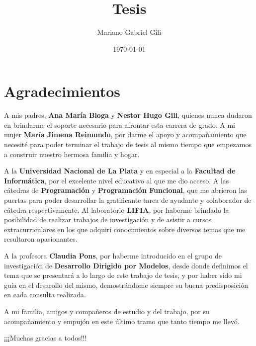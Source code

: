 \documentclass[a4paper,12pt,oneside,spanish]{book}
\author{Mariano Gabriel Gili}
\title{Tesis}
\date{\today}
\begin{document}
 \maketitle

\frontmatter
\tableofcontents
\listoffigures


\chapter{Agradecimientos}


A mis padres, \textbf{Ana María Bloga} y \textbf{Nestor Hugo Gili}, quienes nunca dudaron en brindarme el soporte necesario para afrontar esta carrera de grado. A mi mujer \textbf{María Jimena Reimundo}, por darme el apoyo y acompañamiento que necesité para poder terminar el trabajo de tesis al mismo tiempo que empezamos a construir nuestro hermosa familia y hogar.

\bigskip

A la \textbf{Universidad Nacional de La Plata} y en especial a la \textbf{Facultad de Informática}, por el excelente nivel educativo al que me dio acceso. A las cátedras de \textbf{Programación} y \textbf{Programación Funcional}, que me abrieron las puertas para poder desarrollar la gratificante tarea de ayudante y colaborador de cátedra respectívamente. Al laboratorio \textbf{LIFIA}, por haberme brindado la posibilidad de realizar trabajos de investigación y de asistir a cursos extracurriculares en los que adquirí conocimientos sobre diversos temas que me resultaron apasionantes.

\bigskip

A la profesora \textbf{Claudia Pons}, por haberme introducido en el grupo de investigación de \textbf{Desarrollo Dirigido por Modelos}, desde donde definimos el tema que se presentará a lo largo de este trabajo de tesis, y por  haber sido mi guía en el desarollo del mismo, demostrándome siempre su buena predisposición en cada consulta realizada.

\bigskip

A mi familia, amigos y compañeros de estudio y del trabajo, por su acompañamiento y empujón en este último tramo que tanto tiempo me llevó.

\bigskip

¡¡¡Muchas gracias a todos!!!
\end{document}
